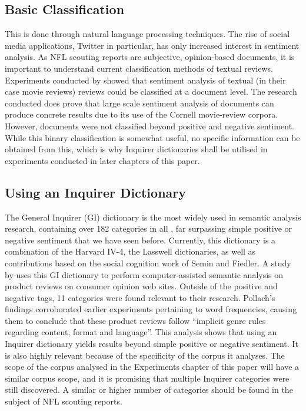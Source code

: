 \documentclass[oneside,12pt]{Classes/RoboticsLaTeX}
\begin{document}
\subsection{Basic Classification}
This is done through natural language processing techniques. The rise of social media applications, Twitter in particular, 
has only increased interest in sentiment analysis. As NFL scouting reports are subjective, opinion-based documents, it is important to understand current classification methods of textual reviews. Experiments conducted by 
\citet{SentiAnalysis} showed that sentiment analysis of textual (in their case movie reviews) reviews could be classified at a document level. The research conducted does prove that large scale sentiment analysis of documents can
produce concrete results due to its use of the Cornell movie-review corpora. However, documents were not classified beyond positive and negative sentiment. While this binary classification is somewhat useful,
no specific information can be obtained from this, which is why Inquirer dictionaries shall be utilised in experiments conducted in later chapters of this paper.

\subsection{Using an Inquirer Dictionary}
The General Inquirer (GI) dictionary is the most widely used in semantic analysis research, containing over 182 categories in all \citep{stone66}, 
far surpassing simple positive or negative sentiment that we have seen before. Currently, this dictionary is a combination of the Harvard IV-4, the Lasswell dictionaries, as well as contributions based on the social cognition work of 
Semin and Fiedler. A study by \citet{SentiGI} uses this GI dictionary to perform computer-assisted semantic analysis on product reviews on consumer opinion web sites. Outside of the positive and negative tags, 11 categories 
were found relevant to their research. Pollach's findings corroborated earlier experiments pertaining to word frequencies, causing them to conclude that these product reviews follow ``implicit genre rules regarding content, format 
and language''. This analysis shows that using an Inquirer dictionary yields results beyond simple positive or negative sentiment. It is also highly relevant because of the specificity of the corpus it analyses. The scope of the corpus analysed
in the Experiments chapter of this paper will have a similar corpus scope, and it is promising that multiple Inquirer categories were still discovered. A similar or higher number of categories should be found in the subject of NFL scouting reports.
\end{document}
